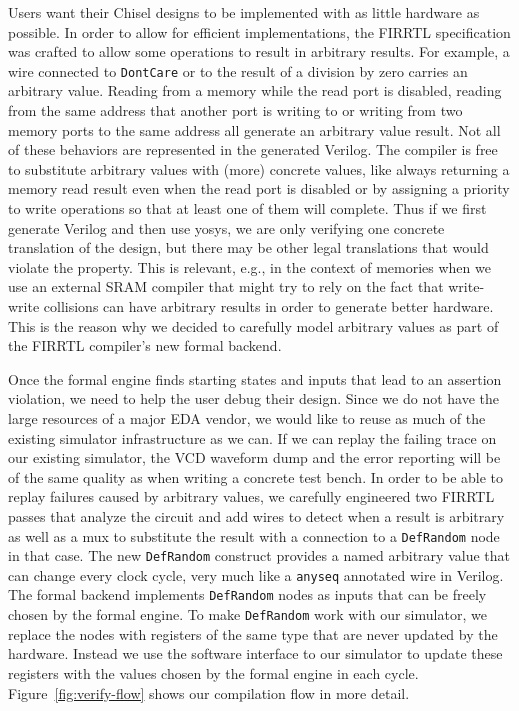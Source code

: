 \documentclass[conference]{IEEEtran}
\newcommand{\code}[1]{{\small{\texttt{#1}}}}
\begin{document}
Users want their Chisel designs to be implemented with as little hardware as possible.
In order to allow for efficient implementations, the FIRRTL specification was crafted to allow
some operations to result in arbitrary results.
For example, a wire connected to \code{DontCare} or to the result of a division by zero carries an arbitrary value.
Reading from a memory while the read port is disabled, reading from the same address that another port is writing to or
writing from two memory ports to the same address all generate an arbitrary value result.
Not all of these behaviors are represented in the generated Verilog.
The compiler is free to substitute arbitrary values with (more) concrete values, like always returning a memory read result even
when the read port is disabled or by assigning a priority to write operations so that at least one of them will complete.
Thus if we first generate Verilog and then use yosys, we are only verifying one concrete translation of the design,
but there may be other legal translations that would violate the property.
This is relevant, e.g., in the context of memories when we use an external SRAM compiler that might try to
rely on the fact that write-write collisions can have arbitrary results in order to generate better hardware.
This is the reason why we decided to carefully model arbitrary values as part of the FIRRTL compiler's new formal backend.

Once the formal engine finds starting states and inputs that lead to an assertion violation, we need to help the user debug their design.
Since we do not have the large resources of a major EDA vendor, we would like to reuse as much of the existing simulator infrastructure as we can.
If we can replay the failing trace on our existing simulator, the VCD waveform dump and the error reporting will be of the same quality as
when writing a concrete test bench.
In order to be able to replay failures caused by arbitrary values, we carefully engineered two FIRRTL passes that analyze the circuit and
add wires to detect when a result is arbitrary as well as a mux to substitute the result with a connection to a \code{DefRandom} node in that case.
The new \code{DefRandom} construct provides a named arbitrary value that can change every clock cycle,
very much like a \code{anyseq} annotated wire in Verilog.
The formal backend implements \code{DefRandom} nodes as inputs that can be freely chosen by the formal engine.
To make \code{DefRandom} work with our simulator, we  replace the nodes with registers of the same type that are never updated by the hardware.
Instead we use the software interface to our simulator to update these registers with the values chosen by the formal engine in each cycle.
Figure~\ref{fig:verify-flow} shows our compilation flow in more detail.
\end{document}
